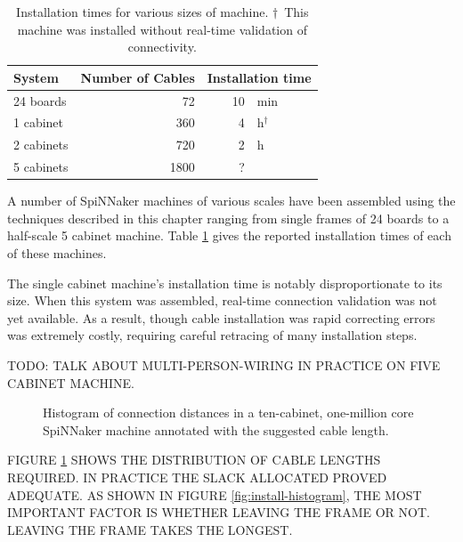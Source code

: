 			\begin{table}
				\center
				\begin{tabular}{lrr@{$\,$}l}
					\toprule
						System & Number of Cables & \multicolumn{2}{r}{Installation time} \\
					\midrule
						24 boards  & \num{72}   & \num{10} & \si{\minute}         \\
						1 cabinet  & \num{360}  & \num{4}  & \si{\hour}$^\dagger$ \\
						2 cabinets & \num{720}  & \num{2}  & \si{\hour}           \\
						5 cabinets & \num{1800} & ?        &                      \\
					\bottomrule
				\end{tabular}
				
				\caption{Installation times for various sizes of machine.
				$\dagger$~This machine was installed without real-time validation of
				connectivity.}
				\label{tab:install-time}
			\end{table}
			
			A number of SpiNNaker machines of various scales have been assembled
			using the techniques described in this chapter ranging from single frames
			of 24 boards to a half-scale 5 cabinet machine. Table
			\ref{tab:install-time} gives the reported installation times of each of
			these machines.
			
			The single cabinet machine's installation time is notably
			disproportionate to its size. When this system was assembled, real-time
			connection validation was not yet available. As a result, though cable
			installation was rapid correcting errors was extremely costly, requiring
			careful retracing of many installation steps.
			
			TODO: TALK ABOUT MULTI-PERSON-WIRING IN PRACTICE ON FIVE CABINET MACHINE.
			
			\begin{figure}
				
				\center
				
				\caption{Histogram of connection distances in a ten-cabinet,
				one-million core SpiNNaker machine annotated with the suggested cable
				length.}
				\label{fig:wire-length-histogram}
				
			\end{figure}
			
			FIGURE \ref{fig:wire-length-histogram} SHOWS THE DISTRIBUTION OF CABLE
			LENGTHS REQUIRED. IN PRACTICE THE SLACK ALLOCATED PROVED ADEQUATE. AS
			SHOWN IN FIGURE \ref{fig:install-histogram}, THE MOST IMPORTANT FACTOR IS
			WHETHER LEAVING THE FRAME OR NOT. LEAVING THE FRAME TAKES THE LONGEST.
			
